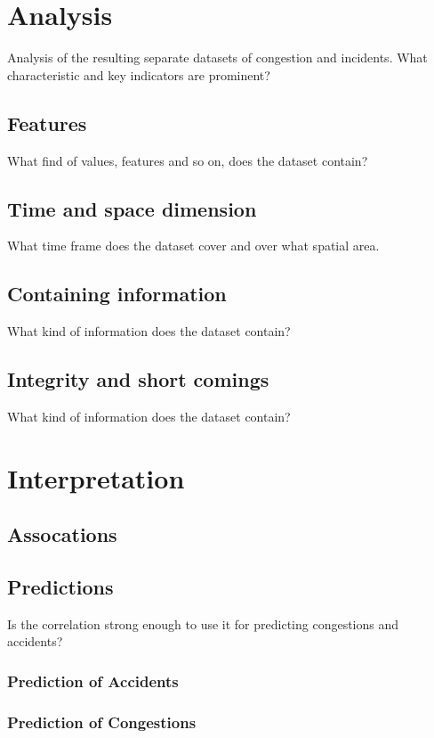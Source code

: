 \documentclass[a4paper,12pt]{report}
\begin{document}
\cite{Potvin2020}


\chapter{Analysis}

Analysis of the resulting separate datasets of congestion and incidents. What characteristic and key indicators are prominent?
\section{Features}
What find of values, features and so on, does the dataset contain?
\section{Time and space dimension}
What time frame does the dataset cover and over what spatial area.
\section{Containing information}
What kind of information does the dataset contain?
\section{Integrity and short comings}
What kind of information does the dataset contain?

\chapter{Interpretation}

\section{Assocations}

\section{Predictions}
Is the correlation strong enough to use it for predicting congestions and accidents?

\subsection{Prediction of Accidents}

\subsection{Prediction of Congestions}
\end{document}
